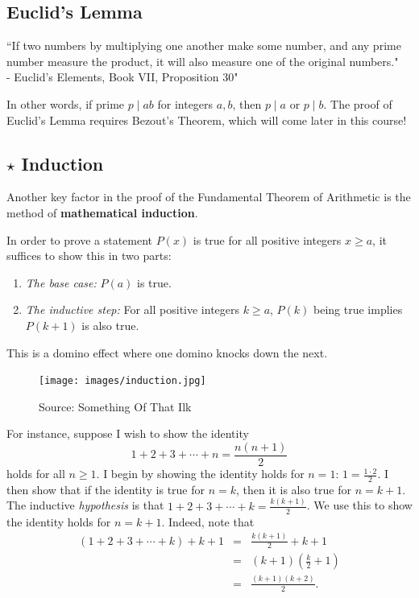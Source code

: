 \subsection{Euclid's Lemma}
\begin{displayquote} ``If two numbers by multiplying one another make some number, and any prime number measure the product, it will also measure one of the original numbers." \\ - Euclid's Elements, Book VII, Proposition 30" \end{displayquote}
In other words, if prime $p\mid ab$ for integers $a,b$, then $p\mid a$ or $p\mid b$. The proof of Euclid's Lemma requires Bezout's Theorem, which will come later in this course! 

\clearpage
\subsection{$\star$ Induction}
Another key factor in the proof of the Fundamental Theorem of Arithmetic is the method of \textbf{mathematical induction}.
	
\begin{defi}[Induction] In order to prove a statement $P(x)$ is true for all positive integers $x\ge a$, it suffices to show this in two parts: \begin{enumerate}
		\item \textit{The base case:} $P(a)$ is true.
		\item \textit{The inductive step:} For all positive integers $k\ge a$, $P(k)$ being true implies $P(k+1)$ is also true.
		\end{enumerate}  
		This is a domino effect where one domino knocks down the next.
\end{defi}

\clearpage

\begin{figure}[h]
	\centering\texttt{[image: images/induction.jpg]}
	\caption{Source: Something Of That Ilk}
\end{figure}
\clearpage

For instance, suppose I wish to show the identity $$1+2+3+\cdots+n=\frac{n(n+1)}{2}$$ holds for all $n\ge 1$.
I begin by showing the identity holds for $n=1$: $1=\frac{1\cdot 2}{2}$. I then show that if the identity is true for $n=k$, then it is also true for $n=k+1$. The inductive \textit{hypothesis} is that $1+2+3+\cdots+k=\frac{k(k+1)}{2}$. We use this to show the identity holds for $n=k+1$. Indeed, note that \begin{eqnarray*} \left(1+2+3+\cdots+k\right)+k+1 &=& \frac{k(k+1)}{2}+k+1 \\ &=& (k+1)\left(\frac{k}{2}+1\right) \\ &=& \frac{(k+1)(k+2)}{2}. \end{eqnarray*}

